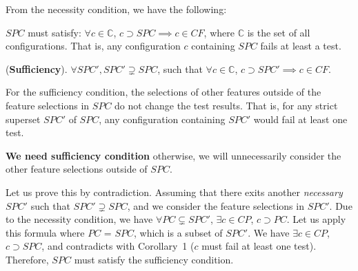 

From the necessity condition, we have the following:

\begin{Corollary}
$SPC$ must satisfy: $\forall c \in \mathbb{C}$, $c \supset SPC \implies c \in CF$, where $\mathbb{C}$ is the set of all configurations. That is, any configuration $c$ containing $SPC$ fails at least a test.
\end{Corollary}


\begin{Definition}{({\bf Sufficiency}).}
$\forall SPC', SPC' \supsetneq SPC$, such that $\forall c \in \mathbb{C}$, $c \supset SPC' \implies c \in CF$.
\end{Definition}


For the sufficiency condition, the selections of other features
outside of the feature selections in $SPC$ do not change the test
results. That is, for any strict superset $SPC'$ of $SPC$, any
configuration containing $SPC'$ would fail at least one test.

{\bf We need sufficiency condition} otherwise, we will
unnecessarily consider the other feature selections outside of $SPC$.
%

 Let us prove this by contradiction. Assuming
that there exits another {\em necessary} $SPC'$ such that $SPC'
\supsetneq SPC$, and we consider the feature selections in $SPC'$.
%
Due to the necessity condition, we have $\forall PC \subsetneq SPC'$,
$\exists c \in CP$, $c \supset PC$.
%
Let us apply this formula where $PC$ = $SPC$, which is a subset of $SPC'$.
We have $\exists c \in CP$, $c \supset SPC$, and contradicts
with Corollary~1 ($c$ must fail at least one test).
%
Therefore, $SPC$ must satisfy the sufficiency condition.


